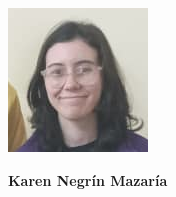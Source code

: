 \begin{minipage}{0.2\textwidth}
	\includegraphics[width=\linewidth]{img/concursantes/karen.png} %
\end{minipage}
\hfill
\begin{minipage}{0.7\textwidth}
	\textbf{Karen Negrín Mazaría}
	
\end{minipage}



